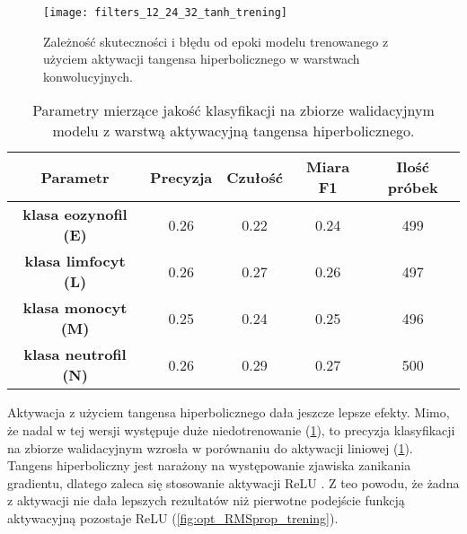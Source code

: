 {\begin{figure}[h!]
	\centering
	\centering
		\texttt{[image: filters\_12\_24\_32\_tanh\_trening]}	
	\caption{Zależność skuteczności i błędu od epoki modelu trenowanego z użyciem aktywacji tangensa hiperbolicznego w warstwach konwolucyjnych.}\label{fig:filters_12_24_32_tanh_trening}
\end{figure}

\begin{table}[h!]
\centering
\caption[Short Heading]{Parametry mierzące jakość klasyfikacji na zbiorze walidacyjnym modelu z warstwą aktywacyjną tangensa hiperbolicznego.}
\label{tab:tanh_act_layers_params_val}
\begin{tabular}{|c|c|c|c|c|}
\hline
\textbf{Parametr}                               & \textbf{Precyzja} & \textbf{Czułość} & \textbf{Miara F1} & \textbf{Ilość próbek} \\ \hline
\textbf{klasa eozynofil (E)} & 0.26   & 0.22   & 0.24 & 499  \\ \hline
\textbf{klasa limfocyt (L)}& 0.26   & 0.27   & 0.26 & 497  \\ \hline
\textbf{klasa monocyt (M)} & 0.25   & 0.24   & 0.25 & 496  \\ \hline
\textbf{klasa neutrofil (N)} & 0.26   & 0.29    & 0.27 & 500  \\ \hline
\end{tabular}
\end{table}

Aktywacja z użyciem tangensa hiperbolicznego dała jeszcze lepsze efekty. Mimo, że nadal w tej wersji występuje duże niedotrenowanie (\ref{fig:filters_12_24_32_tanh_trening}), to precyzja klasyfikacji na zbiorze walidacyjnym wzrosła w porównaniu do aktywacji liniowej (\ref{tab:tanh_act_layers_params_val}). Tangens hiperboliczny jest narażony na występowanie zjawiska zanikania gradientu, dlatego zaleca się stosowanie aktywacji ReLU \cite{activation_functions}. Z teo powodu, że żadna z aktywacji nie dała lepszych rezultatów niż pierwotne podejście funkcją aktywacyjną pozostaje ReLU (\ref{fig:opt_RMSprop_trening}).

}



